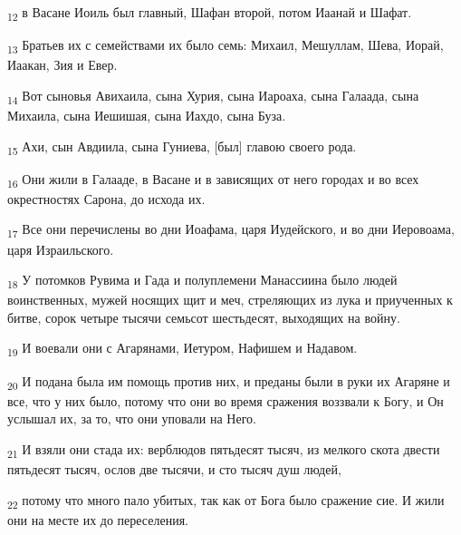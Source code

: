\begin{tcolorbox}
\textsubscript{12} в Васане Иоиль был главный, Шафан второй, потом Иаанай и Шафат.
\end{tcolorbox}
\begin{tcolorbox}
\textsubscript{13} Братьев их с семействами их было семь: Михаил, Мешуллам, Шева, Иорай, Иаакан, Зия и Евер.
\end{tcolorbox}
\begin{tcolorbox}
\textsubscript{14} Вот сыновья Авихаила, сына Хурия, сына Иароаха, сына Галаада, сына Михаила, сына Иешишая, сына Иахдо, сына Буза.
\end{tcolorbox}
\begin{tcolorbox}
\textsubscript{15} Ахи, сын Авдиила, сына Гуниева, [был] главою своего рода.
\end{tcolorbox}
\begin{tcolorbox}
\textsubscript{16} Они жили в Галааде, в Васане и в зависящих от него городах и во всех окрестностях Сарона, до исхода их.
\end{tcolorbox}
\begin{tcolorbox}
\textsubscript{17} Все они перечислены во дни Иоафама, царя Иудейского, и во дни Иеровоама, царя Израильского.
\end{tcolorbox}
\begin{tcolorbox}
\textsubscript{18} У потомков Рувима и Гада и полуплемени Манассиина было людей воинственных, мужей носящих щит и меч, стреляющих из лука и приученных к битве, сорок четыре тысячи семьсот шестьдесят, выходящих на войну.
\end{tcolorbox}
\begin{tcolorbox}
\textsubscript{19} И воевали они с Агарянами, Иетуром, Нафишем и Надавом.
\end{tcolorbox}
\begin{tcolorbox}
\textsubscript{20} И подана была им помощь против них, и преданы были в руки их Агаряне и все, что у них было, потому что они во время сражения воззвали к Богу, и Он услышал их, за то, что они уповали на Него.
\end{tcolorbox}
\begin{tcolorbox}
\textsubscript{21} И взяли они стада их: верблюдов пятьдесят тысяч, из мелкого скота двести пятьдесят тысяч, ослов две тысячи, и сто тысяч душ людей,
\end{tcolorbox}
\begin{tcolorbox}
\textsubscript{22} потому что много пало убитых, так как от Бога было сражение сие. И жили они на месте их до переселения.
\end{tcolorbox}
